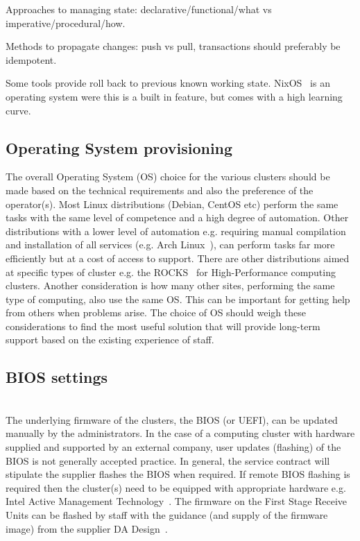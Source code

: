 \documentclass[12pt,a4paper]{article}
\begin{document}
Approaches to managing state: declarative/functional/what vs imperative/procedural/how.

Methods to propagate changes: push vs pull, transactions should preferably be idempotent.

Some tools provide roll back to previous known working state. 
NixOS~\cite{nixos} is an operating system were this is a built in feature, but comes with a high learning curve. 

\subsection{Operating System provisioning}
\label{ssec:os-prov}
The overall Operating System (OS) choice for the various clusters should be made based on the technical requirements and also the preference of the operator(s).
Most Linux distributions (Debian, CentOS etc) perform the same tasks with the same level of competence and a high degree of automation.
Other distributions with a lower level of automation e.g. requiring manual compilation and installation of all services (e.g. Arch Linux~\cite{archlinux}), can perform tasks far more efficiently but at a cost of access to support.  
There are other distributions aimed at specific types of cluster e.g. the ROCKS~\cite{rocks} for High-Performance computing clusters.
Another consideration is how many other sites, performing the same type of computing, also use the same OS.
This can be important for getting help from others when problems arise.
The choice of OS should weigh these considerations to find the most useful solution that will provide long-term support based on the existing experience of staff.


\subsection{BIOS settings} \label{ssec:bios} \\%
The underlying firmware of the clusters, the BIOS (or UEFI), can be updated manually by the administrators.
In the case of a computing cluster with hardware supplied and supported by an external company, user updates (flashing) of the BIOS is not generally accepted practice.
In general, the service contract will stipulate the supplier flashes the BIOS when required.
If remote BIOS flashing is required then the cluster(s) need to be equipped with appropriate hardware e.g. Intel Active Management Technology~\cite{intel-amt}.
The firmware on the First Stage Receive Units can be flashed by \EC staff with the guidance (and supply of the firmware image) from the supplier DA Design~\cite{da-design}.
\end{document}

